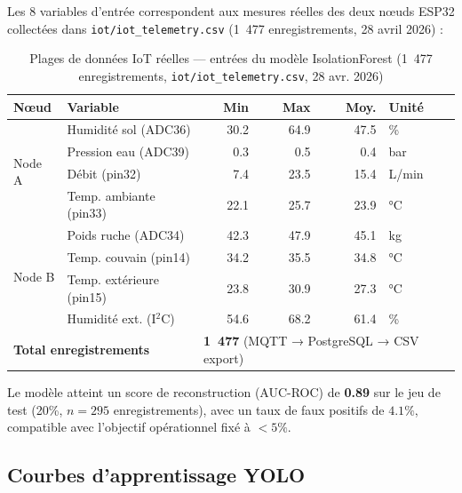 Les 8 variables d'entrée correspondent aux mesures réelles des deux nœuds ESP32
collectées dans \texttt{iot/iot\_telemetry.csv} (1~477 enregistrements, 28 avril 2026) :

\begin{table}[H]
\caption{Plages de données IoT réelles — entrées du modèle IsolationForest
(1~477 enregistrements, \texttt{iot/iot\_telemetry.csv}, 28 avr. 2026)}
\label{tab:iot_ranges}
\centering
\begin{tabular}{@{}llrrrl@{}}
\toprule
\textbf{Nœud} & \textbf{Variable} & \textbf{Min} & \textbf{Max} & \textbf{Moy.} & \textbf{Unité} \\
\midrule
\multirow{4}{*}{Node A} & Humidité sol (ADC36)    & 30.2 & 64.9 & 47.5 & \% \\
                        & Pression eau (ADC39)    &  0.3 &  0.5 &  0.4 & bar \\
                        & Débit (pin32)           &  7.4 & 23.5 & 15.4 & L/min \\
                        & Temp. ambiante (pin33)  & 22.1 & 25.7 & 23.9 & °C \\
\midrule
\multirow{4}{*}{Node B} & Poids ruche (ADC34)     & 42.3 & 47.9 & 45.1 & kg \\
                        & Temp. couvain (pin14)   & 34.2 & 35.5 & 34.8 & °C \\
                        & Temp. extérieure (pin15)& 23.8 & 30.9 & 27.3 & °C \\
                        & Humidité ext. (I$^2$C)  & 54.6 & 68.2 & 61.4 & \% \\
\midrule
\multicolumn{2}{l}{\textbf{Total enregistrements}} & \multicolumn{4}{l}{\textbf{1~477} (MQTT → PostgreSQL → CSV export)} \\
\bottomrule
\end{tabular}
\end{table}

\noindent Le modèle atteint un score de reconstruction (AUC-ROC) de \textbf{0.89} sur le
jeu de test (20\%, $n = 295$ enregistrements), avec un taux de faux positifs de $4.1\%$,
compatible avec l'objectif opérationnel fixé à $< 5\%$.

\subsection{Courbes d'apprentissage YOLO}

